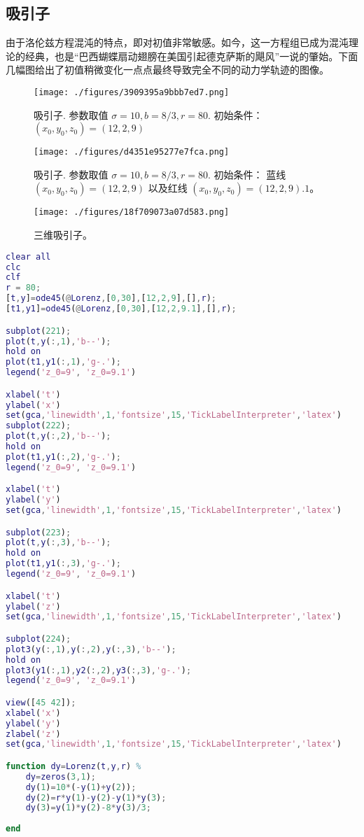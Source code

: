 \subsection{吸引子}
由于洛伦兹方程混沌的特点，即对初值非常敏感。如今，这一方程组已成为混沌理论的经典，也是“巴西蝴蝶扇动翅膀在美国引起德克萨斯的飓风”一说的肇始。下面几幅图给出了初值稍微变化一点点最终导致完全不同的动力学轨迹的图像。


\begin{figure}[ht]
\centering
\texttt{[image: ./figures/3909395a9bbb7ed7.png]}
\caption{吸引子. 参数取值 $\sigma=10,b=8/3, r=80$. 初始条件： $(x_0,y_0,z_0)=(12,2,9)$} \label{fig_LrzAct_1}
\end{figure}

\begin{figure}[ht]
\centering
\texttt{[image: ./figures/d4351e95277e7fca.png]}
\caption{吸引子. 参数取值 $\sigma=10,b=8/3, r=80$. 初始条件： 蓝线 $(x_0,y_0,z_0)=(12,2,9)$ 以及红线 $(x_0,y_0,z_0)=(12,2,9).1$。} \label{fig_LrzAct_2}
\end{figure}

\begin{figure}[ht]
\centering
\texttt{[image: ./figures/18f709073a07d583.png]}
\caption{三维吸引子。} \label{fig_LrzAct_3}
\end{figure}

\begin{lstlisting}[language=matlab, caption=lorenz.m]
clear all
clc
clf
r = 80;
[t,y]=ode45(@Lorenz,[0,30],[12,2,9],[],r);
[t1,y1]=ode45(@Lorenz,[0,30],[12,2,9.1],[],r);

subplot(221);
plot(t,y(:,1),'b--');
hold on
plot(t1,y1(:,1),'g-.');
legend('z_0=9', 'z_0=9.1')

xlabel('t')
ylabel('x')
set(gca,'linewidth',1,'fontsize',15,'TickLabelInterpreter','latex')
subplot(222);
plot(t,y(:,2),'b--');
hold on
plot(t1,y1(:,2),'g-.');
legend('z_0=9', 'z_0=9.1')

xlabel('t')
ylabel('y')
set(gca,'linewidth',1,'fontsize',15,'TickLabelInterpreter','latex')

subplot(223);
plot(t,y(:,3),'b--');
hold on
plot(t1,y1(:,3),'g-.');
legend('z_0=9', 'z_0=9.1')

xlabel('t')
ylabel('z')
set(gca,'linewidth',1,'fontsize',15,'TickLabelInterpreter','latex')

subplot(224);
plot3(y(:,1),y(:,2),y(:,3),'b--');
hold on
plot3(y1(:,1),y2(:,2),y3(:,3),'g-.');
legend('z_0=9', 'z_0=9.1')

view([45 42]);
xlabel('x')
ylabel('y')
zlabel('z')
set(gca,'linewidth',1,'fontsize',15,'TickLabelInterpreter','latex')

function dy=Lorenz(t,y,r) %
    dy=zeros(3,1);
    dy(1)=10*(-y(1)+y(2));
    dy(2)=r*y(1)-y(2)-y(1)*y(3);
    dy(3)=y(1)*y(2)-8*y(3)/3;
    
end
\end{lstlisting}
